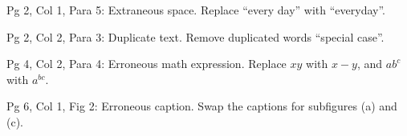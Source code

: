 \documentclass[letterpaper,10pt,twocolumn]{article}
\begin{document}
\begin{CheckBoxItem}
{Pg 2, Col 1, Para 5: Extraneous space.}
Replace ``every day'' with ``everyday''.
\end{CheckBoxItem}

\begin{CheckBoxItem}
{Pg 2, Col 2, Para 3: Duplicate text.}
Remove duplicated words ``special case''.
\end{CheckBoxItem}

\begin{CheckBoxItem}
{Pg 4, Col 2, Para 4: Erroneous math expression.}
Replace $xy$ with $x-y$, and $ab^c$ with $a^{bc}$.
\end{CheckBoxItem}

\begin{CheckBoxItem}
{Pg 6, Col 1, Fig 2: Erroneous caption.}
Swap the captions for subfigures (a) and (c).
\end{CheckBoxItem}
\end{document}
